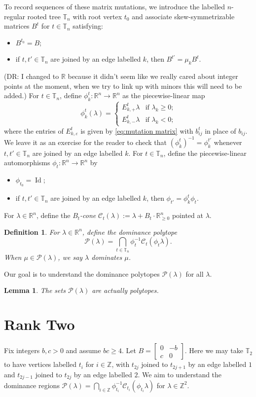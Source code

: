 \documentclass{amsart}
\newtheorem{definition}[theorem]{Definition}
\newtheorem{lemma}[theorem]{Lemma}
\numberwithin{theorem}{section}
\newcommand{\cC}{\mathcal{C}}
\newcommand{\cP}{\mathcal{P}}
\newcommand{\RR}{\mathbb{R}}
\newcommand{\TT}{\mathbb{T}}
\newcommand{\ZZ}{\mathbb{Z}}
\newcommand{\Id}{\operatorname{Id}}
\begin{document}
  To record sequences of these matrix mutations, we introduce the labelled $n$-regular rooted tree $\TT_n$ with root vertex $t_0$ and associate skew-symmetrizable matrices $B^t$ for $t\in\TT_n$ satisfying:
  \begin{itemize}
    \item $B^{t_0}=B$;
    \item if $t,t'\in\TT_n$ are joined by an edge labelled $k$, then $B^{t'}=\mu_k B^t$.
  \end{itemize}

  (DR: I changed to $\RR$ because it didn't seem like we really cared about integer points at the moment, when we try to link up with minors this will need to be added.)
  For $t\in\TT_n$, define $\phi^t_k:\RR^n\to\RR^n$ as the piecewise-linear map
  \[\phi^t_k(\lambda)=\begin{cases} E^t_{k,+}\lambda & \text{if $\lambda_k\ge0$;}\\ E^t_{k,-}\lambda & \text{if $\lambda_k<0$;} \end{cases}\]
  where the entries of $E^t_{k,\varepsilon}$ is given by \eqref{eq:mutation matrix} with $b^t_{ij}$ in place of $b_{ij}$.
  We leave it as an exercise for the reader to check that $(\phi^t_k)^{-1}=\phi^{t'}_k$ whenever $t,t'\in\TT_n$ are joined by an edge labelled $k$.
  For $t\in\TT_n$, define the piecewise-linear automorphisms $\phi_t:\RR^n\to\RR^n$ by
  \begin{itemize}
    \item $\phi_{t_0}=\Id$;
    \item if $t,t'\in\TT_n$ are joined by an edge labelled $k$, then $\phi_{t'}=\phi^t_k \phi_t$.
  \end{itemize}
  For $\lambda\in\RR^n$, define the \emph{$B_t$-cone} $\cC_t(\lambda):=\lambda+B_t\cdot\RR_{\ge0}^n$ pointed at $\lambda$.
  \begin{definition}
    For $\lambda\in\RR^n$, define the \emph{dominance polytope} 
    \[ \cP(\lambda) = \bigcap_{t\in\TT_n} \phi_t^{-1} \cC_t(\phi_t \lambda). \]
    When $\mu\in\cP(\lambda)$, we say \emph{$\lambda$ dominates $\mu$}.
  \end{definition}
  Our goal is to understand the dominance polytopes $\cP(\lambda)$ for all $\lambda$.
  \begin{lemma}
    The sets $\cP(\lambda)$ are actually polytopes.
  \end{lemma}

  \section{Rank Two}
  Fix integers $b,c>0$ and assume $bc\ge 4$.
  Let $B=\left[ \begin{array}{cc} 0 & -b \\ c & 0 \end{array} \right]$.
  Here we may take $\TT_2$ to have vertices labelled $t_i$ for $i\in\ZZ$, with $t_{2j}$ joined to $t_{2j+1}$ by an edge labelled $1$ and $t_{2j-1}$ joined to $t_{2j}$ by an edge labelled $2$.
  We aim to understand the dominance regions $\cP(\lambda) = \bigcap_{i\in\ZZ} \phi_{t_i}^{-1} \cC_{t_i}(\phi_{t_i} \lambda)$ for $\lambda\in\ZZ^2$.
\end{document}
